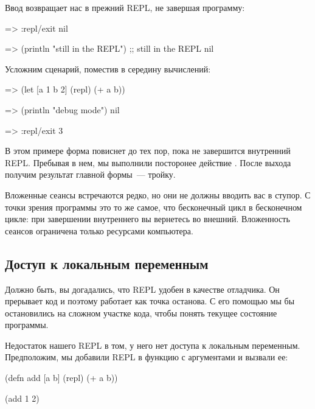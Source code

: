 Ввод  возвращает нас в прежний REPL, не завершая программу:

\begin{english}
  \begin{clojure}
=> :repl/exit
nil

=> (println "still in the REPL")
;; still in the REPL
nil
  \end{clojure}
\end{english}

Усложним сценарий, поместив  в середину вычислений:

\begin{english}
  \begin{clojure/lines}
=> (let [a 1 b 2] (repl) (+ a b))

=> (println "debug mode")
nil

=> :repl/exit
3
  \end{clojure/lines}
\end{english}

В этом примере форма  повиснет до тех пор, пока не завершится внутренний REPL. Пребывая в нем, мы выполнили посторонее действие . После выхода получим результат главной формы~--- тройку.

Вложенные сеансы встречаются редко, но они не должны вводить вас в ступор. С точки зрения программы это то же самое, что бесконечный цикл в бесконечном цикле: при завершении внутреннего вы вернетесь во внешний. Вложенность сеансов ограничена только ресурсами компьютера.

\subsection{Доступ к локальным переменным}

Должно быть, вы догадались, что REPL удобен в качестве отладчика. Он прерывает код и поэтому работает как точка останова. С его помощью мы бы остановились на сложном участке кода, чтобы понять текущее состояние программы.

Недостаток нашего REPL в том, у него нет доступа к локальным переменным. Предположим, мы добавили REPL в функцию с аргументами и вызвали ее:

\begin{english}
  \begin{clojure}
(defn add [a b]
  (repl)
  (+ a b))

(add 1 2)
  \end{clojure}
\end{english}

